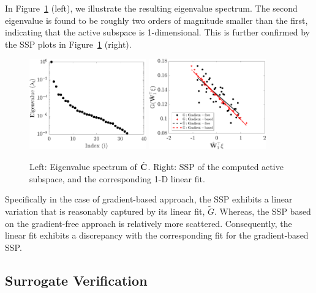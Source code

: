 In Figure~\ref{fig:hd} (left), we illustrate the resulting eigenvalue spectrum. The second eigenvalue is
found to be roughly two orders of magnitude smaller than the first, indicating that the active subspace
is 1-dimensional. This is further confirmed by the SSP plots in Figure~\ref{fig:hd} (right). 
%
\begin{figure}[htbp]
 \begin{center}
   \includegraphics[width=0.45\textwidth]{./Figures/eig_33D}
   \includegraphics[width=0.45\textwidth]{./Figures/ssp_33D}
\caption{Left: Eigenvalue spectrum of $\hat{\mathbf{{C}}}$. Right: SSP of the computed active subspace, and the
corresponding 1-D linear fit.} 
\label{fig:hd}
\end{center}
\end{figure}
%
Specifically
in the case of gradient-based approach, the SSP exhibits a linear variation that is reasonably
captured by its linear fit, $\tilde{G}$. Whereas, the SSP based on the gradient-free approach
is relatively more scattered. Consequently, the linear fit exhibits a discrepancy with the corresponding
fit for the gradient-based SSP. 

\subsection{Surrogate Verification}
\label{sub:verify}

